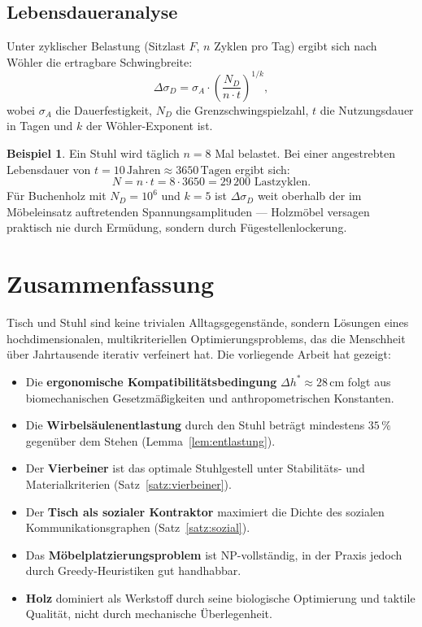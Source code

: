 \documentclass[a4paper,12pt]{article}
\theoremstyle{definition}
\newtheorem{beispiel}{Beispiel}
\begin{document}
\subsection{Lebensdaueranalyse}

Unter zyklischer Belastung (Sitzlast $F$, $n$ Zyklen pro Tag) ergibt sich nach
W\"{o}hler die ertragbare Schwingbreite:
\[
	\Delta\sigma_D = \sigma_A \cdot \left(\frac{N_D}{n \cdot t}\right)^{1/k},
\]
wobei $\sigma_A$ die Dauerfestigkeit, $N_D$ die Grenzschwingspielzahl, $t$ die
Nutzungsdauer in Tagen und $k$ der W\"{o}hler-Exponent ist.

\begin{beispiel}
	Ein Stuhl wird t\"{a}glich $n = 8$ Mal belastet. Bei einer angestrebten Lebensdauer
	von $t = 10\,\text{Jahren} \approx 3650\,\text{Tagen}$ ergibt sich:
	\[
		N = n \cdot t = 8 \cdot 3650 = 29\,200 \text{ Lastzyklen.}
	\]
	F\"{u}r Buchenholz mit $N_D = 10^6$ und $k = 5$ ist $\Delta\sigma_D$ weit oberhalb
	der im M\"{o}beleinsatz auftretenden Spannungsamplituden --- Holzm\"{o}bel versagen
	praktisch nie durch Erm\"{u}dung, sondern durch F\"{u}gestellenlockerung.
\end{beispiel}

\section{Zusammenfassung}

Tisch und Stuhl sind keine trivialen Alltagsgegenst\"{a}nde, sondern L\"{o}sungen eines
hochdimensionalen, multikriteriellen Optimierungsproblems, das die Menschheit \"{u}ber
Jahrtausende iterativ verfeinert hat. Die vorliegende Arbeit hat gezeigt:
\begin{itemize}
	\item Die \textbf{ergonomische Kompatibilit\"{a}tsbedingung}
	      $\Delta h^* \approx 28\,\mathrm{cm}$ folgt aus biomechanischen
	      Gesetzm\"{a}\ss{}igkeiten und anthropometrischen Konstanten.
	\item Die \textbf{Wirbels\"{a}ulenentlastung} durch den Stuhl betr\"{a}gt mindestens
	      $35\,\%$ gegen\"{u}ber dem Stehen (Lemma~\ref{lem:entlastung}).
	\item Der \textbf{Vierbeiner} ist das optimale Stuhlgestell unter Stabilit\"{a}ts- und
	      Materialkriterien (Satz~\ref{satz:vierbeiner}).
	\item Der \textbf{Tisch als sozialer Kontraktor} maximiert die Dichte des sozialen
	      Kommunikationsgraphen (Satz~\ref{satz:sozial}).
	\item Das \textbf{M\"{o}belplatzierungsproblem} ist NP-vollst\"{a}ndig, in der Praxis
	      jedoch durch Greedy-Heuristiken gut handhabbar.
	\item \textbf{Holz} dominiert als Werkstoff durch seine biologische Optimierung und
	      taktile Qualit\"{a}t, nicht durch mechanische \"{U}berlegenheit.
\end{itemize}
\end{document}
